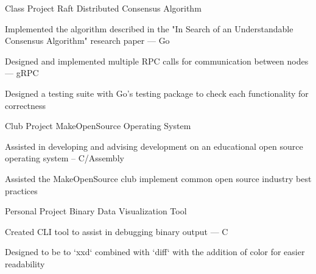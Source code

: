 

\begin{cventries}

  \cventry
    {Class Project} %
    {Raft Distributed Consensus Algorithm} %
    {} %
    {} %
    {
      \begin{cvitems} %
        \item Implemented the algorithm described in the "In Search of an Understandable Consensus Algorithm" research paper --- Go 
	\item Designed and implemented multiple RPC calls for communication between nodes --- gRPC
    \item Designed a testing suite with Go's testing package to check each functionality for correctness
      \end{cvitems}
    }


  \cventry
    {Club Project} %
    {MakeOpenSource Operating System} %
    {} %
    {} %
    {
      \begin{cvitems} %
        \item Assisted in developing and advising development on an educational open source operating system -- C/Assembly
        \item Assisted the MakeOpenSource club implement common open source industry best practices
      \end{cvitems}
    }
  \cventry
    {Personal Project} %
    {Binary Data Visualization Tool} %
    {} %
    {} %
    {
      \begin{cvitems} %
        \item Created CLI tool to assist in debugging binary output --- C
        \item Designed to be to `xxd` combined with `diff` with the addition of color for easier readability
      \end{cvitems}
    }



\end{cventries}
